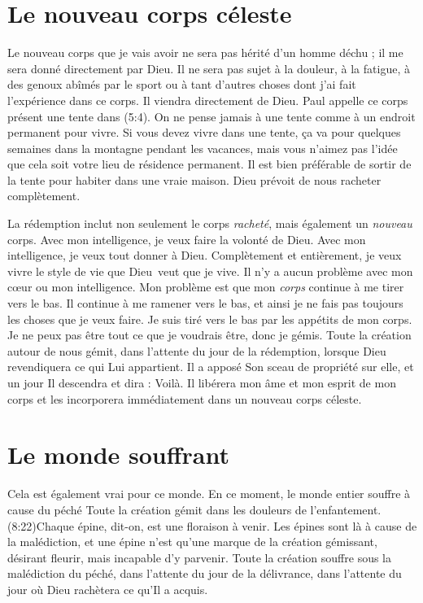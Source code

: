 \section{Le nouveau corps c\'eleste}

Le nouveau corps que je vais avoir ne sera pas hérité d'un homme déchu ;
 il me sera donné directement par Dieu.
 Il ne sera pas sujet à la douleur, à la fatigue, à des genoux abîmés
 par le sport ou à tant d'autres choses dont j'ai fait l'expérience
  dans ce corps. Il viendra directement de Dieu.
 Paul appelle ce corps présent une \Og tente \Fg{} dans (5:4).
 On ne pense jamais à une tente comme à un endroit permanent pour vivre.
 Si vous devez vivre dans une tente, ça va pour quelques semaines
 dans la montagne pendant les vacances, mais vous n'aimez pas l'idée
 que cela soit votre lieu de résidence permanent.
 Il est bien préférable de sortir de la tente pour habiter dans une vraie maison.
 Dieu prévoit de nous racheter complètement.

La rédemption inclut non seulement le corps \emph{racheté}, mais également
 un \emph{nouveau} corps. Avec mon intelligence, je veux faire la volonté de Dieu.
 Avec mon intelligence, je veux tout donner à Dieu.
 Complètement et entièrement, je veux vivre le style de vie que Dieu~veut
 que je vive. Il n'y a aucun problème avec mon cœur ou mon intelligence.
 Mon problème est que mon \emph{corps} continue à me tirer vers le bas.
 Il continue à me ramener vers le bas, et ainsi je ne fais pas toujours
 les choses que je veux faire. Je suis tiré vers le bas par les appétits
 de mon corps. Je ne peux pas être tout ce que je voudrais être,
 donc je gémis. Toute la création autour de nous gémit,
 dans l'attente du jour de la rédemption, lorsque Dieu revendiquera ce qui Lui appartient.
 Il a apposé Son sceau de propriété sur elle, et un jour Il descendra
 et dira : \Og Voilà. \Fg{}
 Il libérera mon âme et mon esprit de mon corps et les incorporera
 immédiatement dans un nouveau corps céleste.


\section{Le monde souffrant}

Cela est également vrai pour ce monde.
 En ce moment, le monde entier souffre à cause du péché\frcolon{}
 \Og Toute la création gémit dans les douleurs de l'enfantement. \Fg{}
 (8:22)Chaque épine, dit-on,
 est une floraison à venir.
 Les épines sont là à cause de la malédiction, et une épine n'est qu'une 
 marque de la création gémissant, désirant fleurir, mais incapable
 d'y parvenir. Toute la création souffre sous la malédiction du péché,
 dans l'attente du jour de la délivrance, dans l'attente du jour
 où Dieu rachètera ce qu'Il a acquis.

